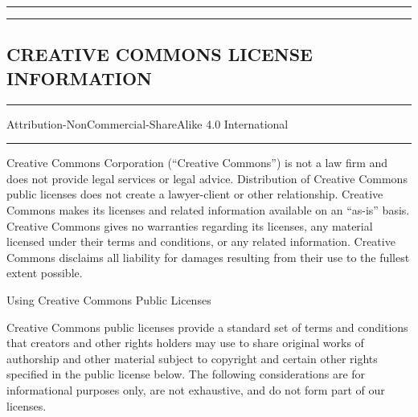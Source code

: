 \documentclass[
]{scrbook}
\begin{document}
\tiny

\begin{center}\rule{0.5\linewidth}{0.5pt}\end{center}

\begin{center}\rule{0.5\linewidth}{0.5pt}\end{center}

\hypertarget{creative-commons-license-information}{%
\subsection{CREATIVE COMMONS LICENSE
INFORMATION}\label{creative-commons-license-information}}

\begin{center}\rule{0.5\linewidth}{0.5pt}\end{center}

Attribution-NonCommercial-ShareAlike 4.0 International

\begin{center}\rule{0.5\linewidth}{0.5pt}\end{center}

Creative Commons Corporation (``Creative Commons'') is not a law firm
and does not provide legal services or legal advice. Distribution of
Creative Commons public licenses does not create a lawyer-client or
other relationship. Creative Commons makes its licenses and related
information available on an ``as-is'' basis. Creative Commons gives no
warranties regarding its licenses, any material licensed under their
terms and conditions, or any related information. Creative Commons
disclaims all liability for damages resulting from their use to the
fullest extent possible.

Using Creative Commons Public Licenses

Creative Commons public licenses provide a standard set of terms and
conditions that creators and other rights holders may use to share
original works of authorship and other material subject to copyright and
certain other rights specified in the public license below. The
following considerations are for informational purposes only, are not
exhaustive, and do not form part of our licenses.
\end{document}
